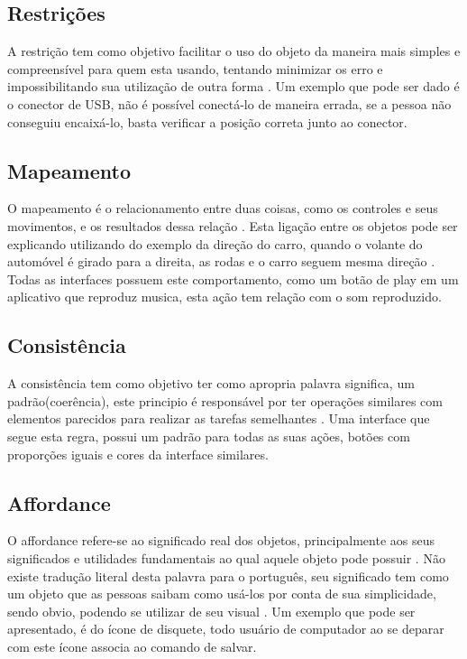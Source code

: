 \documentclass[12pt,oneside,a4paper,chapter=TITLE,section=TITLE,sumario=tradicional]{abntex2}
\begin{document}
\subsection{Restrições}
\label{sec:restricoes}

A restrição tem como objetivo facilitar o uso do objeto da maneira mais simples e compreensível para quem esta usando, tentando minimizar os erro e impossibilitando sua utilização de outra forma \cite{norman2002}. Um exemplo que pode ser dado é o conector de USB, não é possível conectá-lo de maneira errada, se a pessoa não conseguiu encaixá-lo, basta verificar a posição correta junto ao conector.

\subsection{Mapeamento}
\label{sec:mapeamento}

O mapeamento é o relacionamento entre duas coisas, como os controles e seus movimentos, e os resultados dessa relação \cite{norman2002}. Esta ligação entre os objetos pode ser explicando utilizando do exemplo da direção do carro, quando o volante do automóvel é girado para a direita, as rodas e o carro seguem mesma direção \cite{norman2002}. Todas as interfaces possuem este comportamento, como um botão de play em um aplicativo que reproduz musica, esta ação tem relação com o som reproduzido.

\subsection{Consistência}
\label{sec:consciencia}

A consistência tem como objetivo ter como apropria palavra significa, um padrão(coerência), este principio é responsável por ter operações similares com elementos parecidos para realizar as tarefas semelhantes \cite{agni2015}. Uma interface que segue esta regra, possui um padrão para todas as suas ações, botões com proporções iguais e cores da interface similares.

\subsection{Affordance}
\label{sec:affordance}

O affordance refere-se ao significado real dos objetos, principalmente aos seus significados e utilidades fundamentais ao qual aquele objeto pode possuir \cite{norman2002}. Não existe tradução literal desta palavra para o português, seu significado tem como um objeto que as pessoas saibam como usá-los por conta de sua simplicidade, sendo obvio, podendo se utilizar de seu visual \cite{agni2015}. Um exemplo que pode ser apresentado, é do ícone de disquete, todo usuário de computador ao se deparar com este ícone associa ao comando de salvar.
\end{document}
